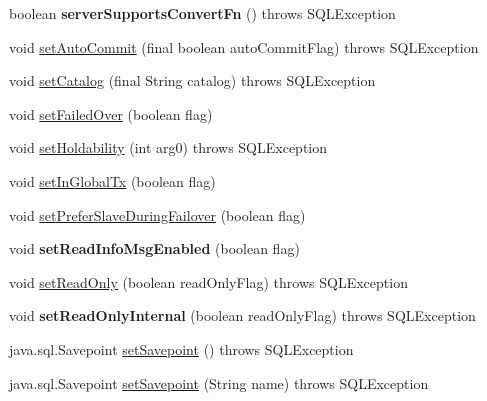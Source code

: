\begin{DoxyCompactItemize}
boolean {\bfseries server\+Supports\+Convert\+Fn} ()  throws S\+Q\+L\+Exception 
\item 
void \mbox{\hyperlink{classcom_1_1mysql_1_1jdbc_1_1_connection_impl_aa5a8a261dfc670c3426f7949a56056ca}{set\+Auto\+Commit}} (final boolean auto\+Commit\+Flag)  throws S\+Q\+L\+Exception 
\item 
void \mbox{\hyperlink{classcom_1_1mysql_1_1jdbc_1_1_connection_impl_a70eceba08a9ec6b4e248e053d62ddc40}{set\+Catalog}} (final String catalog)  throws S\+Q\+L\+Exception 
\item 
void \mbox{\hyperlink{classcom_1_1mysql_1_1jdbc_1_1_connection_impl_aae5bb4c31a9c4260599f64e7cbec0a7a}{set\+Failed\+Over}} (boolean flag)
\item 
void \mbox{\hyperlink{classcom_1_1mysql_1_1jdbc_1_1_connection_impl_a2256a399a6e5a89f8becf3dbe081101b}{set\+Holdability}} (int arg0)  throws S\+Q\+L\+Exception 
\item 
void \mbox{\hyperlink{classcom_1_1mysql_1_1jdbc_1_1_connection_impl_abbec8e30775ad9e356305f31e2219bec}{set\+In\+Global\+Tx}} (boolean flag)
\item 
void \mbox{\hyperlink{classcom_1_1mysql_1_1jdbc_1_1_connection_impl_a419ce8a33f7efdabf8fd3a38b81e94a7}{set\+Prefer\+Slave\+During\+Failover}} (boolean flag)
\item 
\mbox{\label{classcom_1_1mysql_1_1jdbc_1_1_connection_impl_ac14c23af21441cb556be7bb6990c2d54}} 
void {\bfseries set\+Read\+Info\+Msg\+Enabled} (boolean flag)
\item 
void \mbox{\hyperlink{classcom_1_1mysql_1_1jdbc_1_1_connection_impl_a9a4ecd97e6b235da639bf42c6daf9a8d}{set\+Read\+Only}} (boolean read\+Only\+Flag)  throws S\+Q\+L\+Exception 
\item 
\mbox{\label{classcom_1_1mysql_1_1jdbc_1_1_connection_impl_a12aad98af369eacdff7d40957f2995da}} 
void {\bfseries set\+Read\+Only\+Internal} (boolean read\+Only\+Flag)  throws S\+Q\+L\+Exception 
\item 
java.\+sql.\+Savepoint \mbox{\hyperlink{classcom_1_1mysql_1_1jdbc_1_1_connection_impl_ac4302ad8b26bd780dc6c3c3219924b76}{set\+Savepoint}} ()  throws S\+Q\+L\+Exception 
\item 
java.\+sql.\+Savepoint \mbox{\hyperlink{classcom_1_1mysql_1_1jdbc_1_1_connection_impl_a50c5912b1869b1ee14920da16cf3259b}{set\+Savepoint}} (String name)  throws S\+Q\+L\+Exception 

\end{DoxyCompactItemize}
